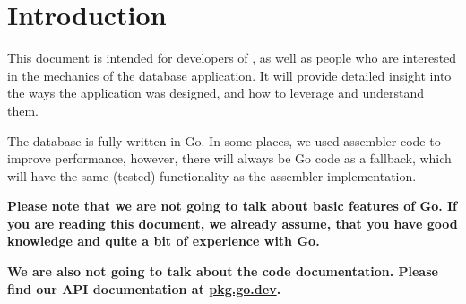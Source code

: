 \section{Introduction}
This document is intended for developers of \xdb{}, as well as people who are interested in the mechanics of the database application.
It will provide detailed insight into the ways the application was designed, and how to leverage and understand them.

The database is fully written in Go.
In some places, we used assembler code to improve performance, however, there will always be Go code as a fallback, which will have the same (tested) functionality as the assembler implementation.

\textbf{
Please note that we are not going to talk about basic features of Go.
If you are reading this document, we already assume, that you have good knowledge and quite a bit of experience with Go.
}

\textbf{
We are also not going to talk about the code documentation.
Please find our API documentation at \href{https://pkg.go.dev/github.com/xqueries/xdb}{pkg.go.dev}.
}
